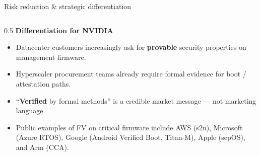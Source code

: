 \documentclass[aspectratio=169,11pt]{beamer}
\newcommand{\hil}[1]{\textbf{\textcolor{nvgreendark}{#1}}}
\begin{document}
\begin{frame}{Risk reduction \& strategic differentiation}
\begin{columns}[T,onlytextwidth]
    \begin{column}{0.5\textwidth}
      \footnotesize
      \textbf{Differentiation for NVIDIA}
      \begin{itemize}\setlength\itemsep{0.15em}
        \item Datacenter customers increasingly ask for
              \hil{provable} security properties on management firmware.
        \item Hyperscaler procurement teams already require formal
              evidence for boot / attestation paths.
        \item ``\hil{Verified} by formal methods'' is a credible
              market message — not marketing language.
        \item Public examples of FV on critical firmware include
              AWS (s2n), Microsoft (Azure RTOS),
              Google (Android Verified Boot, Titan-M),
              Apple (sepOS), and Arm (CCA).
      \end{itemize}
    \end{column}
  \end{columns}
\end{frame}
\end{document}
